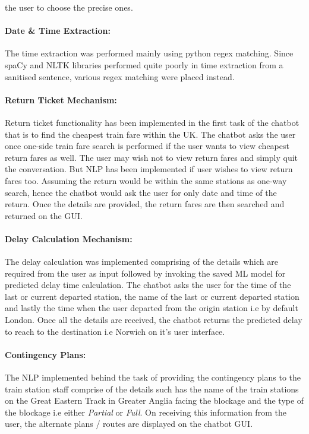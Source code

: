 the user to choose the precise ones. \paragraph{Date \& Time Extraction:} The time extraction was performed mainly using python regex matching. Since spaCy and NLTK libraries performed quite poorly in time extraction from a sanitised sentence, various regex matching were placed instead. \paragraph{Return Ticket Mechanism:} Return ticket functionality has been implemented in the first task of the chatbot that is to find the cheapest train fare within the UK. The chatbot asks the user once one-side train fare search is performed if the user wants to view cheapest return fares as well. The user may wish not to view return fares and simply quit the conversation. But NLP has been implemented if user wishes to view return fares too. Assuming the return would be within the same stations as one-way search, hence the chatbot would ask the user for only date and time of the return. Once the details are provided, the return fares are then searched and returned on the GUI. \paragraph{Delay Calculation Mechanism:} The delay calculation was implemented comprising of the details which are required from the user as input followed by invoking the saved ML model for predicted delay time calculation. The chatbot asks the user for the time of the last or current departed station, the name of the last or current departed station and lastly the time when the user departed from the origin station i.e by default London. Once all the details are received, the chatbot returns the predicted delay to reach to the destination i.e Norwich on it's user interface. \paragraph{Contingency Plans:} The NLP implemented behind the task of providing the contingency plans to the train station staff comprise of the details such has the name of the train stations on the Great Eastern Track in Greater Anglia facing the blockage and the type of the blockage i.e either \textit{Partial} or \textit{Full}. On receiving this information from the user, the alternate plans / routes are displayed on the chatbot GUI.

